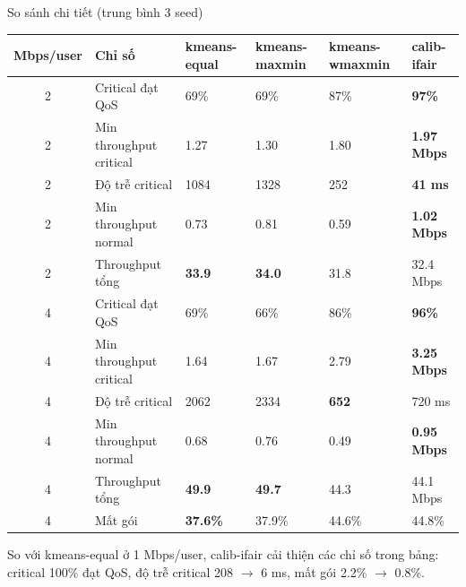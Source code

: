 \documentclass[aspectratio=169,10pt,t]{beamer}
\newcommand{\good}[1]{\textcolor{Good}{\textbf{#1}}}
\begin{document}
\begin{frame}{So sánh chi tiết (trung bình 3 seed)}
\small
\begin{tabularx}{\linewidth}{@{}clXXXX@{}}
  \toprule
  \textbf{Mbps/user} & \textbf{Chỉ số} & \textbf{kmeans-equal} & \textbf{kmeans-maxmin} & \textbf{kmeans-wmaxmin} & \textbf{calib-ifair}\\
  \midrule
  2 & Critical đạt QoS & 69\% & 69\% & 87\% & \good{97\%}\\
  2 & Min throughput critical & 1.27 & 1.30 & 1.80 & \good{1.97 Mbps}\\
  2 & Độ trễ critical & 1084 & 1328 & 252 & \good{41 ms}\\
  2 & Min throughput normal & 0.73 & 0.81 & 0.59 & \good{1.02 Mbps}\\
  2 & Throughput tổng & \textbf{33.9} & \textbf{34.0} & 31.8 & 32.4 Mbps\\
  \midrule
  4 & Critical đạt QoS & 69\% & 66\% & 86\% & \good{96\%}\\
  4 & Min throughput critical & 1.64 & 1.67 & 2.79 & \good{3.25 Mbps}\\
  4 & Độ trễ critical & 2062 & 2334 & \textbf{652} & 720 ms\\
  4 & Min throughput normal & 0.68 & 0.76 & 0.49 & \good{0.95 Mbps}\\
  4 & Throughput tổng & \textbf{49.9} & \textbf{49.7} & 44.3 & 44.1 Mbps\\
  4 & Mất gói & \textbf{37.6\%} & 37.9\% & 44.6\% & 44.8\%\\
  \bottomrule
\end{tabularx}
\vspace{2mm}

\scriptsize So với kmeans-equal ở 1 Mbps/user, calib-ifair cải thiện các chỉ số trong bảng: critical 100\% đạt QoS, độ trễ critical 208 $\rightarrow$ 6 ms, mất gói 2.2\% $\rightarrow$ 0.8\%.
\end{frame}
\end{document}
